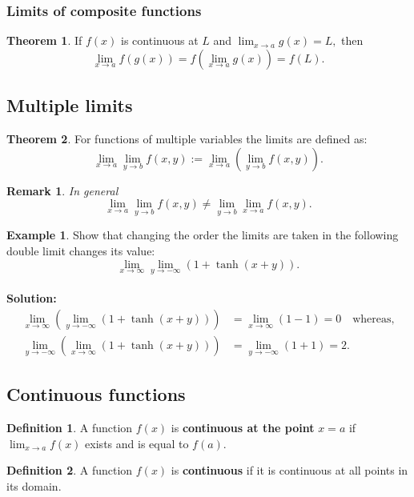 \documentclass[12pt, a4paper]{article}
\newtheorem*{remark}{Remark}
\theoremstyle{definition}
\newtheorem{definition}{Definition}[section]
\newtheorem{theorem}{Theorem}[section]
\newtheorem*{example}{Example}
\theoremstyle{plain}
\begin{document}
\subsubsection{Limits of composite functions}

\begin{theorem}
If $f(x)$ is continuous at $L$ and $\lim_{x\to a} g(x) = L,$ then $$\lim_{x\to a}f(g(x))=f\left(\lim_{x\to a} g(x)\right)=f(L).$$
\end{theorem}

\subsection{Multiple limits}

\begin{theorem}
For functions of multiple variables the limits are defined as: $$\lim_{x\to a}\lim_{y\to b}f(x,y):=\lim_{x\to a}\left(\lim_{y\to b}f(x,y)\right).$$
\end{theorem}

\begin{remark}
In general $$\lim_{x\to a}\lim_{y\to b}f(x,y) \neq \lim_{y\to b}\lim_{x\to a}f(x,y).$$
\end{remark}

\begin{example}
Show that changing the order the limits are taken in the following double limit changes its value: $$\lim_{x\to \infty}\lim_{y\to-\infty}(1+\tanh(x+y)).$$ \\
\textbf{Solution:} $$\begin{aligned}
\lim_{x\to \infty}\left(\lim_{y\to-\infty}(1+\tanh(x+y))\right) &= \lim_{x\to \infty} (1-1)=0 \quad \text{whereas,} \\
\lim_{y\to -\infty}\left(\lim_{x\to\infty}(1+\tanh(x+y))\right) &= \lim_{y\to -\infty} (1+1)=2.
\end{aligned}$$
\end{example}

\subsection{Continuous functions}

\begin{definition}
A function $f(x)$ is \textbf{continuous at the point} $\mathit{x=a}$ if $\lim_{x \to a} f(x)$ exists and is equal to $f(a).$
\end{definition}

\begin{definition}
A function $f(x)$ is \textbf{continuous} if it is continuous at all points in its domain. 
\end{definition}
\end{document}
